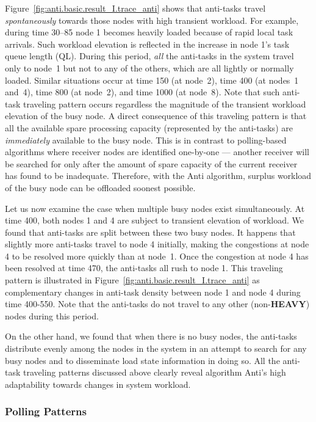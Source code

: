 Figure~\ref{fig:anti.basic.result_I.trace_anti} shows that anti-tasks
travel {\it spontaneously\/} towards those nodes with high transient 
workload.  For example, during time 30--85 node 1 becomes heavily loaded
because of rapid local task arrivals.
Such workload elevation is reflected in the increase in 
node 1's task queue length (QL).
During this period, {\it all\/} the anti-tasks in the system 
travel only to node~1 but not to any of the others,  
which are all lightly or normally loaded.
Similar situations occur at time 150 (at node~2), 
time 400 (at nodes~1 and~4), time 800 (at node~2), and time 1000 (at node~8).
Note that such anti-task traveling pattern occurs regardless
the magnitude of the transient workload elevation of the busy node.
A direct consequence of this traveling pattern is
that all the available spare processing capacity 
(represented by the anti-tasks) are {\it immediately\/}
available to the busy node. This is in contrast to polling-based
algorithms where receiver nodes are identified one-by-one  ---
another receiver will be searched for only after the amount of spare 
capacity of the current receiver has found to be inadequate. 
Therefore, with the {\sc Anti} algorithm, surplus workload
of the busy node can be offloaded soonest possible.

Let us now examine the case when multiple busy nodes exist simultaneously.
At time 400, both nodes 1 and 4 are subject to
transient elevation of workload. 
We found that anti-tasks are split between these two busy nodes.
It happens that slightly more anti-tasks travel to node 4 initially,
making the congestions at node 4 to be resolved more
quickly than at node~1.
Once the congestion at node 4 has been resolved at time 470, 
the anti-tasks all rush to node 1. 
This traveling pattern is illustrated in 
Figure~\ref{fig:anti.basic.result_I.trace_anti}
as complementary changes in anti-task density between node 1 
and node 4 during time 400-550. Note that the anti-tasks do not
travel to any other (non-{\bf HEAVY}) nodes during this period.

On the other hand, we found that when there is no busy nodes, 
the anti-tasks distribute evenly among the nodes in the system in an 
attempt to search for any busy nodes and to disseminate load state
information in doing so. 
All the anti-task traveling patterns discussed above clearly
reveal algorithm {\sc Anti}'s high adaptability towards changes in
system workload.


\subsubsection{Polling Patterns}

